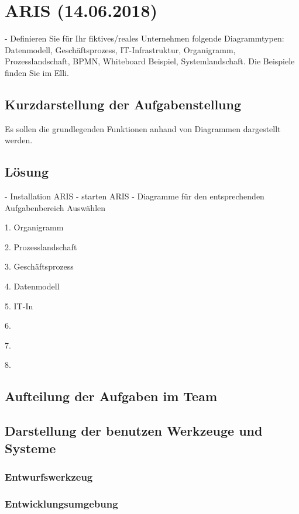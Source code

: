 \section{ARIS (14.06.2018) }
- Definieren Sie für Ihr fiktives/reales Unternehmen folgende Diagrammtypen: Datenmodell, Geschäftsprozess, IT-Infrastruktur, Organigramm, Prozesslandschaft, BPMN, Whiteboard Beispiel, Systemlandschaft. Die Beispiele finden Sie im Elli.

\subsection*{Kurzdarstellung der Aufgabenstellung}
Es sollen die grundlegenden Funktionen anhand von Diagrammen dargestellt werden.
\subsection*{Lösung}
- Installation ARIS
- starten ARIS
- Diagramme für den entsprechenden Aufgabenbereich Auswählen

1. Organigramm

2. Prozesslandschaft

3. Geschäftsprozess

4. Datenmodell

5. IT-In

6.

7.

8.

\subsection*{Aufteilung der Aufgaben im Team}
\subsection*{Darstellung der benutzen Werkzeuge und Systeme}
\subsubsection*{Entwurfswerkzeug}
\subsubsection*{Entwicklungsumgebung}

